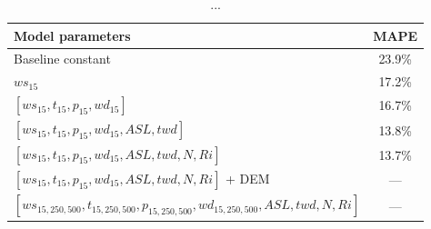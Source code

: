 \begin{table}[h]
    \caption[Model results for different sets of parameters.]{...}
    \label{table:setsOfParams}
    \centering
    \begin{tabular}{lc}
        \toprule
        \textbf{Model parameters} & \textbf{MAPE}\\
        \midrule
        Baseline constant & 23.9\%\\
        $ws_{15}$ & 17.2\%\\
        $[ws_{15}, t_{15}, p_{15}, wd_{15}]$ & 16.7\% \\
        $[ws_{15}, t_{15}, p_{15}, wd_{15}, ASL, twd]$ & 13.8\% \\
        $[ws_{15}, t_{15}, p_{15}, wd_{15}, ASL, twd, N, Ri]$ & 13.7\%\\
        $[ws_{15}, t_{15}, p_{15}, wd_{15}, ASL, twd, N, Ri]$ + DEM & ---\\
        $[ws_{15,250,500}, t_{15,250,500}, p_{15,250,500}, wd_{15,250,500}, ASL, twd, N, Ri]$ & --- \\
        \bottomrule
    \end{tabular}
\end{table}